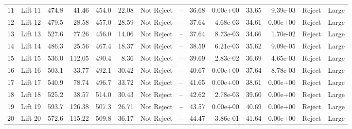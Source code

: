 \begin{tabular}{llrrrrllrrrrll}
11 &  Lift 11 &              474.8 &   41.46 &               454.0 &  22.08 &  Not Reject &          -- &                    36.68 &  0.00e+00 &                     33.65 &  9.39e-03 &  Reject &       Large \\
12 &  Lift 12 &              479.5 &   28.58 &               457.0 &  28.59 &  Not Reject &          -- &                    37.64 &  4.68e-03 &                     34.61 &  0.00e+00 &  Reject &       Large \\
13 &  Lift 13 &              527.6 &   77.26 &               456.0 &  14.06 &  Not Reject &          -- &                    37.64 &  8.73e-03 &                     34.66 &  1.70e-02 &  Reject &       Large \\
14 &  Lift 14 &              486.3 &   25.56 &               467.4 &  18.37 &  Not Reject &          -- &                    38.59 &  6.21e-03 &                     35.62 &  9.09e-05 &  Reject &       Large \\
15 &  Lift 15 &              536.0 &  112.05 &               490.4 &   8.36 &  Not Reject &          -- &                    39.69 &  2.83e-02 &                     36.69 &  4.65e-03 &  Reject &       Large \\
16 &  Lift 16 &              503.1 &   33.77 &               492.1 &  30.42 &  Not Reject &          -- &                    40.67 &  0.00e+00 &                     37.64 &  8.78e-03 &  Reject &       Large \\
17 &  Lift 17 &              540.9 &   78.74 &               496.7 &  33.72 &  Not Reject &          -- &                    41.65 &  0.00e+00 &                     38.61 &  0.00e+00 &  Reject &       Large \\
18 &  Lift 18 &              525.2 &   38.57 &               514.0 &  30.43 &  Not Reject &          -- &                    42.62 &  2.78e-03 &                     39.60 &  0.00e+00 &  Reject &       Large \\
19 &  Lift 19 &              593.7 &  126.38 &               507.3 &  26.71 &  Not Reject &          -- &                    43.57 &  0.00e+00 &                     40.69 &  0.00e+00 &  Reject &       Large \\
20 &  Lift 20 &              572.6 &  115.22 &               509.8 &  36.17 &  Not Reject &          -- &                    44.47 &  3.86e-01 &                     41.64 &  0.00e+00 &  Reject &       Large \\
\bottomrule
\end{tabular}

